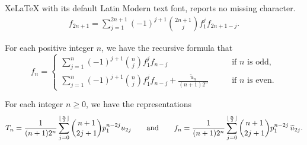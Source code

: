 \documentclass[10pt,a4paper]{amsart}
\begin{document}
XeLaTeX with its default Latin Modern text font, reports no missing character.
\begin{align} \label{Fel_f} f_{2n+1} =  \sum_{j=1}^{2n+1} (-1)^{j+1} \binom{2n+1}j  f_1^j f_{2n+1-j}. \end{align}

\begin{lemma} \label{lm2conj5} For each positive integer $n$, we have the recursive formula that
$$f_n =  \begin{cases}  \sum_{j=1}^n (-1)^{j+1} \binom{n}j  f_1^j f_{n-j} \qquad & \text{if $n$ is odd}, \\
\sum_{j=1}^n (-1)^{j+1} \binom{n}j  f_1^j f_{n-j} + \frac{\widetilde{u}_n}{(n+1)2^n} \qquad & \text{if $n$ is even}. \end{cases}
$$
\end{lemma}

\begin{lemma}  \label{conj5} For each integer $n\geq0$, we have the representations 
$$T_n=\frac1{(n+1)2^n} \sum_{j=0}^{\lfloor\frac{n}2\rfloor} \binom{n+1}{2j+1} p_1^{n-2j} 
u_{2j} \qquad \text{{\rm and}} \qquad
f_n=\frac1{(n+1)2^n} \sum_{j=0}^{\lfloor\frac{n}2\rfloor} \binom{n+1}{2j+1} p_1^{n-2j}\, \widetilde{u}_{2j}.$$
\end{lemma}
\end{document}
